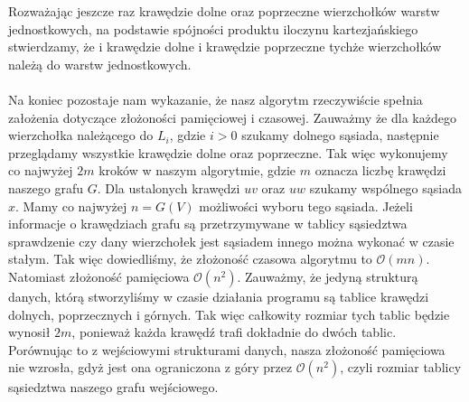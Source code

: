 \documentclass[12pt,a4paper,titlepage]{article}
\begin{document}
Rozważając jeszcze raz krawędzie dolne oraz poprzeczne wierzchołków warstw jednostkowych, na podstawie spójności produktu iloczynu kartezjańskiego stwierdzamy, że i krawędzie dolne i krawędzie poprzeczne tychże wierzchołków należą do warstw jednostkowych.\\
\\
Na koniec pozostaje nam wykazanie, że nasz algorytm rzeczywiście spełnia założenia dotyczące złożoności pamięciowej i czasowej. Zauważmy że dla każdego wierzchołka należącego do $L_i$, gdzie $i>0$ szukamy dolnego sąsiada, następnie przeglądamy wszystkie krawędzie dolne oraz poprzeczne. Tak więc wykonujemy co najwyżej $2m$ kroków w naszym algorytmie, gdzie $m$ oznacza liczbę krawędzi naszego grafu $G$. Dla ustalonych krawędzi $uv$ oraz $uw$ szukamy wspólnego sąsiada $x$. Mamy co najwyżej $n=G(V)$ możliwości wyboru tego sąsiada. Jeżeli informacje o krawędziach grafu są przetrzymywane w tablicy sąsiedztwa sprawdzenie czy dany wierzchołek jest sąsiadem innego można wykonać w czasie stałym. Tak więc dowiedliśmy, że złożoność czasowa algorytmu to $\mathcal{O}(mn)$. Natomiast złożoność pamięciowa $\mathcal{O}(n^2)$. Zauważmy, że jedyną strukturą danych, którą stworzyliśmy w czasie działania programu są tablice krawędzi dolnych, poprzecznych i górnych. Tak więc całkowity rozmiar tych tablic będzie wynosił $2m$, ponieważ każda krawędź trafi dokładnie do dwóch tablic. Porównując to z wejściowymi strukturami danych, nasza złożoność pamięciowa nie wzrosła, gdyż jest ona ograniczona z góry przez $\mathcal{O}(n^2)$, czyli rozmiar tablicy sąsiedztwa naszego grafu wejściowego. \\
\end{document}
